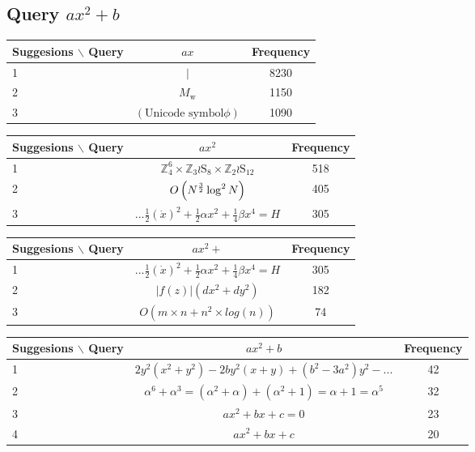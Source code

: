 \documentclass[12pt]{article} %
\begin{document}
\subsection{Query $ax^2+b$}
\begin{center}
\begin{tabular}{lcc}
Suggesions $\backslash$ Query  & $ax$ & Frequency\\
\hline
 1 &  $ | $
   & 8230 \\
 2 &  $  M_{\mathrm{w}}  $
   & 1150 \\
 3 &  $  (\text{Unicode symbol} \phi)  $
   & 1090 \\
\end{tabular}
\end{center}

\begin{center}
\begin{tabular}{lcc}
Suggesions $\backslash$ Query  & $ax^2$ & Frequency\\
\hline
 1 &  $ \mathbb{Z}_{4}^{6}\times\mathbb{Z}_{3}\wr\mathrm{S}_{8}\times\mathbb{Z}_{2}\wr\mathrm{S}_{12} $
   & 518 \\
 2 &  $  O\left(N^{3\over 2}\log^{2}N\right)  $
   & 405 \\
 3 &  $  ... \tfrac{1}{2}\left(\dot{x}\right)^{2}+\tfrac{1}{2}\alpha x^{2}+\tfrac{1}{4}\beta x^{4}=H $
   & 305 \\
\end{tabular}
\end{center}

\begin{center}
\begin{tabular}{lcc}
Suggesions $\backslash$ Query  & $ax^2 + $ & Frequency\\
\hline
 1 &  $  ... \tfrac{1}{2}\left(\dot{x}\right)^{2}+\tfrac{1}{2}\alpha x^{2}+\tfrac{1}{4}\beta x^{4}=H $
   & 305 \\
 2 &  $  |f(z)|(dx^{2}+dy^{2})  $
   & 182 \\
 3 &  $  O(m\times n+n^{2}\times log(n))  $
   & 74 \\
\end{tabular}
\end{center}

\begin{center}
\begin{tabular}{lcc}
Suggesions $\backslash$ Query  & $ax^2 +b $ & Frequency\\
\hline
 1 &  $ 2y^{2}(x^{2}+y^{2})-2by^{2}(x+y)+(b^{2}-3a^{2})y^{2}- ...$
   & 42 \\
 2 &  $ \alpha^{6}+\alpha^{3}=(\alpha^{2}+\alpha)+(\alpha^{2}+1)=\alpha+1=\alpha^{5} $
   & 32 \\
 3 &  $  ax^{2}+bx+c=0   $
   & 23 \\
 4 &  $  ax^{2}+bx+c   $
   & 20 \\
\end{tabular}
\end{center}
\end{document}
